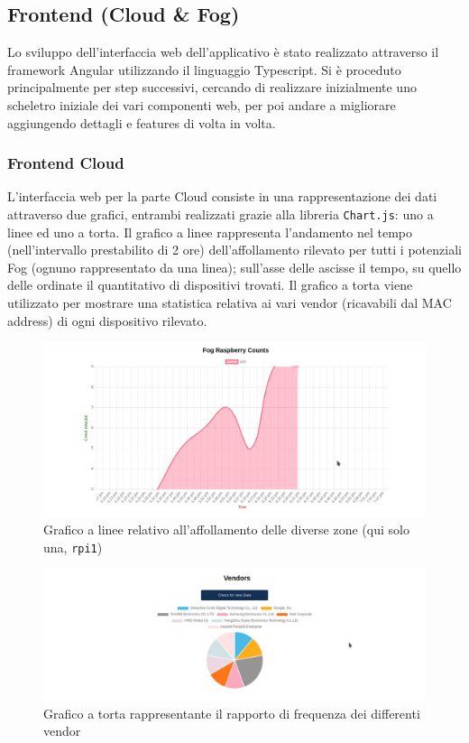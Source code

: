 \subsection{Frontend (Cloud \& Fog)}

Lo sviluppo dell'interfaccia web dell'applicativo è stato realizzato attraverso il framework Angular utilizzando il linguaggio Typescript.
Si è proceduto principalmente per step successivi, cercando di realizzare inizialmente uno scheletro iniziale dei vari componenti web, per poi andare a migliorare aggiungendo dettagli e features di volta in volta.

\subsubsection{Frontend Cloud}

L'interfaccia web per la parte Cloud consiste in una rappresentazione dei dati attraverso due grafici, entrambi realizzati grazie alla libreria \texttt{Chart.js}: uno a linee ed uno a torta.
Il grafico a linee rappresenta l'andamento nel tempo (nell'intervallo prestabilito di 2 ore) dell'affollamento rilevato per tutti i potenziali Fog (ognuno rappresentato da una linea); sull'asse delle ascisse il tempo, su quello delle ordinate il quantitativo di dispositivi trovati.
Il grafico a torta viene utilizzato per mostrare una statistica relativa ai vari vendor (ricavabili dal MAC address) di ogni dispositivo rilevato.

\begin{figure}[H]
  \centering
  \includegraphics[width=\textwidth]{res/fig/cloud-chart.jpg}
  \caption{Grafico a linee relativo all'affollamento delle diverse zone (qui solo una, \texttt{rpi1})}%
  \label{fig:cloud-chart}
\end{figure}

\begin{figure}[H]
  \centering
  \includegraphics[width=\textwidth]{res/fig/cloud-pie.jpg}
  \caption{Grafico a torta rappresentante il rapporto di frequenza dei differenti vendor}%
  \label{fig:cloud-pie}
\end{figure}

